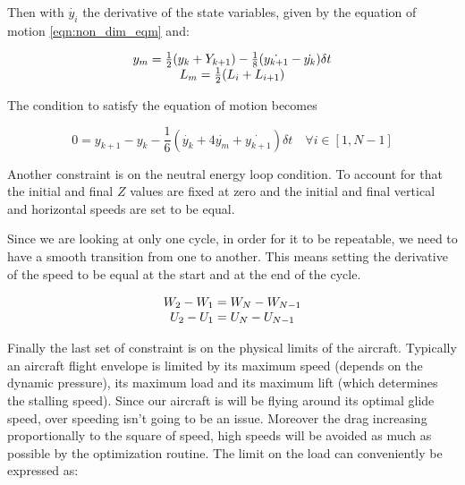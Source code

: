 Then with $\dot{y_i}$ the derivative of the state variables, given by the equation of motion \ref{eqn:non_dim_eqm} and:

\begin{equation}
	\begin{array}[c]{c}
		y_m= \frac{1}{2}(y_k + Y_{k+1}) - \frac{1}{8}(\dot{y_{k+1}} - \dot{y_k})\delta t \\
		L_m=\frac{1}{2}(L_i + L_{i+1})
	\end{array}
	\label{eqn:simpson_middle}
\end{equation}

The condition to satisfy the equation of motion becomes

\begin{equation}
	0=y_{k+1} - y_k - \frac{1}{6}( \dot{y_k} + 4 \dot{y_m} + \dot{y_{k+1}})\delta t \quad \forall i \in [1,N-1]
	\label{eqn:simpson}
\end{equation}

\par Another constraint is on the neutral energy loop condition.
To account for that the initial and final $Z$ values are fixed at zero and the initial and final vertical and horizontal speeds are set to be equal.

\par Since we are looking at only one cycle, in order for it to be repeatable, we need to have a smooth transition from one to another.
This  means setting the derivative of the speed to be equal at the start and at the end of the cycle.

\begin{equation}
	\begin{array}[c]{c}
		W_2 - W_1 = W_N - W_{N-1} \\
		U_2 - U_1 = U_N - U_{N-1} 
	\end{array}
	\label{eqn:derivative_constraint}
\end{equation}

\par Finally the last set of constraint is on the physical limits of the aircraft.
Typically an aircraft flight envelope is limited by its maximum speed (depends on the dynamic pressure), its maximum load and its maximum lift (which determines the stalling speed).
Since our aircraft is will be flying around its optimal glide speed, over speeding isn't going to be an issue.
Moreover the drag increasing proportionally to the square of speed, high speeds will be avoided as much as possible by the optimization routine.
The limit on the load can conveniently be expressed as:

